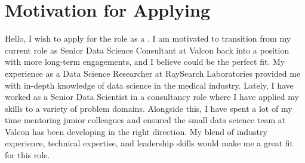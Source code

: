 \section{Motivation for Applying}
Hello, I wish to apply for the role as a \role{}. I am motivated to transition from my current role as Senior Data Science Consultant at Valcon back into a position with more long-term engagements, and I believe \company{} could be the perfect fit. \newpar My experience as a Data Science Researcher at RaySearch Laboratories provided me with in-depth knowledge of data science in the medical industry. Lately, I have worked as a Senior Data Scientist in a consultancy role where I have applied my skills to a variety of problem domains. Alongside this, I have spent a lot of my time mentoring junior colleagues and ensured the small data science team at Valcon has been developing in the right direction. My blend of industry experience, technical expertise, and leadership skills would make me a great fit for this role.
